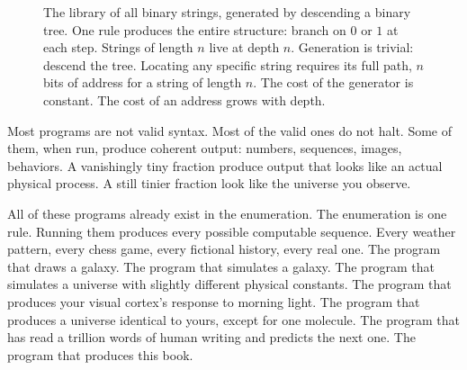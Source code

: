 \begin{figure}[h]
\centering
{}
\caption{The library of all binary strings, generated by descending a binary tree. One rule produces the entire structure: branch on $0$ or $1$ at each step. Strings of length $n$ live at depth $n$. Generation is trivial: descend the tree. Locating any specific string requires its full path, $n$ bits of address for a string of length $n$. The cost of the generator is constant. The cost of an address grows with depth.}
\label{fig:enumeration-tree}
\end{figure}

Most programs are not valid syntax. Most of the valid ones do not halt. Some of them, when run, produce coherent output: numbers, sequences, images, behaviors. A vanishingly tiny fraction produce output that looks like an actual physical process. A still tinier fraction look like the universe you observe.

All of these programs already exist in the enumeration. The enumeration is one rule. Running them produces every possible computable sequence. Every weather pattern, every chess game, every fictional history, every real one. The program that draws a galaxy. The program that simulates a galaxy. The program that simulates a universe with slightly different physical constants. The program that produces your visual cortex's response to morning light. The program that produces a universe identical to yours, except for one molecule. The program that has read a trillion words of human writing and predicts the next one. The program that produces this book.

